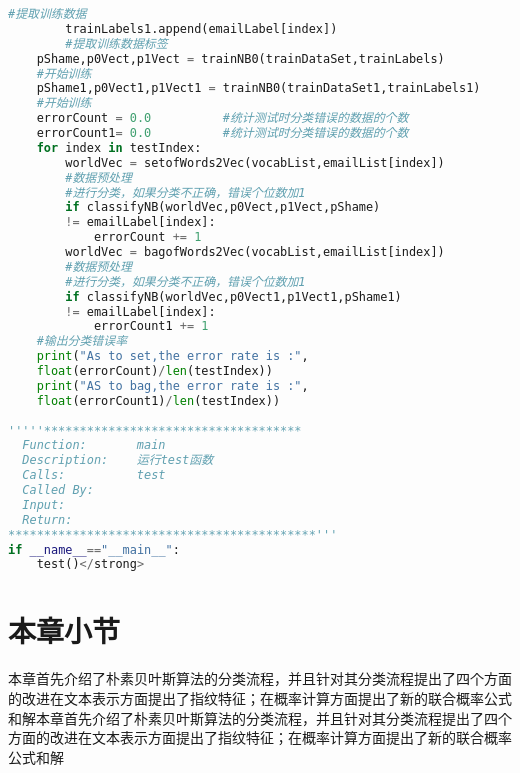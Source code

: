 \begin{lstlisting}[language=python]
        #提取训练数据  
        trainLabels1.append(emailLabel[index])  
        #提取训练数据标签  
    pShame,p0Vect,p1Vect = trainNB0(trainDataSet,trainLabels)
    #开始训练  
    pShame1,p0Vect1,p1Vect1 = trainNB0(trainDataSet1,trainLabels1)
    #开始训练  
    errorCount = 0.0          #统计测试时分类错误的数据的个数  
    errorCount1= 0.0          #统计测试时分类错误的数据的个数  
    for index in testIndex:  
        worldVec = setofWords2Vec(vocabList,emailList[index])
        #数据预处理  
        #进行分类，如果分类不正确，错误个位数加1  
        if classifyNB(worldVec,p0Vect,p1Vect,pShame) 
        != emailLabel[index]:  
            errorCount += 1  
        worldVec = bagofWords2Vec(vocabList,emailList[index])
        #数据预处理  
        #进行分类，如果分类不正确，错误个位数加1  
        if classifyNB(worldVec,p0Vect1,p1Vect1,pShame1) 
        != emailLabel[index]:  
            errorCount1 += 1  
    #输出分类错误率  
    print("As to set,the error rate is :",
    float(errorCount)/len(testIndex))  
    print("AS to bag,the error rate is :",
    float(errorCount1)/len(testIndex))  
      
'''''************************************ 
  Function:       main 
  Description:    运行test函数 
  Calls:          test 
  Called By:        
  Input: 
  Return:           
*******************************************'''  
if __name__=="__main__":  
    test()</strong>  

\end{lstlisting}

\section{本章小节}
本章首先介绍了朴素贝叶斯算法的分类流程，并且针对其分类流程提出了四个方面的改进在文本表示方面提出了指纹特征；在概率计算方面提出了新的联合概率公式和解本章首先介绍了朴素贝叶斯算法的分类流程，并且针对其分类流程提出了四个方面的改进在文本表示方面提出了指纹特征；在概率计算方面提出了新的联合概率公式和解


